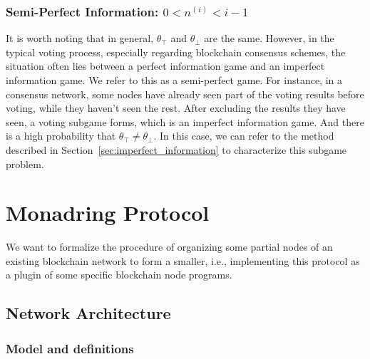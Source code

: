 \documentclass[11pt]{article}
\begin{document}
  \subsubsection{Semi-Perfect Information: $0<n^{(i)}<i-1$}
  It is worth noting that in general, $\theta_\top$ and $\theta_\bot$ are the same. However, in the typical voting process, especially regarding blockchain consensus schemes, the situation often lies between a perfect information game and an imperfect information game. We refer to this as a semi-perfect game. For instance, in a consensus network, some nodes have already seen part of the voting results before voting, while they haven't seen the rest. After excluding the results they have seen, a voting subgame forms, which is an imperfect information game. And there is a high probability that $\theta_\top \neq \theta_\bot$. In this case, we can refer to the method described in Section~\ref{sec:imperfect_information} to characterize this subgame problem.



\section{Monadring Protocol}
\label{sec:protocol}
We want to formalize the procedure of organizing some partial nodes of an existing blockchain network to form a smaller, i.e., implementing this protocol as a plugin of some specific blockchain node programs.
\subsection{Network Architecture}
\subsubsection{Model and definitions}
\end{document}
